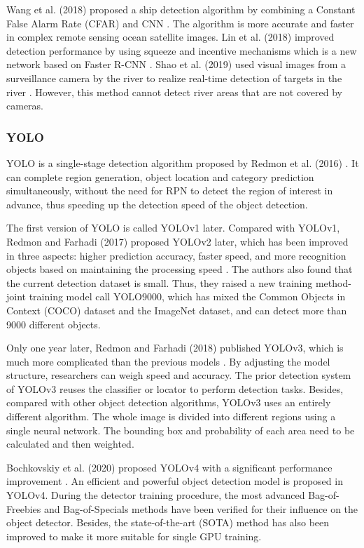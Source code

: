 \documentclass[journal,article,submit,moreauthors,pdftex]{Definitions/mdpi}
\begin{document}
Wang et al. (2018) proposed a ship detection algorithm by combining a Constant False Alarm Rate (CFAR) and CNN \cite {wang2018study}. The algorithm is more accurate and faster in complex remote sensing ocean satellite images. Lin et al. (2018) improved detection performance by using squeeze and incentive mechanisms which is a new network based on Faster R-CNN \cite {lin2018squeeze}. Shao et al. (2019) used visual images from a surveillance camera by the river to realize real-time detection of targets in the river \cite {shao2019saliency}. However, this method cannot detect river areas that are not covered by cameras.


\subsubsection{YOLO}
YOLO is a single-stage detection algorithm proposed by Redmon et al. (2016) \cite{redmon2016you}. It can complete region generation, object location and category prediction simultaneously, without the need for RPN to detect the region of interest in advance, thus speeding up the detection speed of the object detection.

The first version of YOLO is called YOLOv1 later. Compared with YOLOv1, Redmon and Farhadi (2017) proposed YOLOv2 later, which has been improved in three aspects: higher prediction accuracy, faster speed, and more recognition objects based on maintaining the processing speed \cite{redmon2017yolo9000}.
The authors also found that the current detection dataset is small. Thus, they raised a new training method-joint training model call YOLO9000, which has mixed the Common Objects in Context (COCO) dataset and the ImageNet dataset, and can detect more than 9000 different objects.


Only one year later, Redmon and Farhadi (2018) published YOLOv3, which is much more complicated than the previous models \cite{redmon2018yolov3}. By adjusting the model structure, researchers can weigh speed and accuracy. The prior detection system of YOLOv3 reuses the classifier or locator to perform detection tasks. Besides, compared with other object detection algorithms, YOLOv3 uses an entirely different algorithm. The whole image is divided into different regions using a single neural network. The bounding box and probability of each area need to be calculated and then weighted.

Bochkovskiy et al. (2020)  proposed YOLOv4 with a significant performance improvement \cite{bochkovskiy2020yolov4}. An efficient and powerful object detection model is proposed in YOLOv4. During the detector training procedure, the most advanced Bag-of-Freebies and Bag-of-Specials methods have been verified for their influence on the object detector. Besides, the state-of-the-art (SOTA) method has also been improved to make it more suitable for single GPU training.
\end{document}
